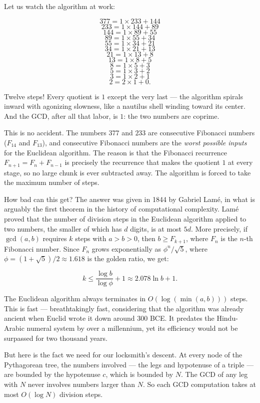 \documentclass[12pt, letterpaper, openany]{book}
\theoremstyle{definition}
\theoremstyle{remark}
\begin{document}
Let us watch the algorithm at work:

\[
377 = 1 \times 233 + 144
\]
\[
233 = 1 \times 144 + 89
\]
\[
144 = 1 \times 89 + 55
\]
\[
89 = 1 \times 55 + 34
\]
\[
55 = 1 \times 34 + 21
\]
\[
34 = 1 \times 21 + 13
\]
\[
21 = 1 \times 13 + 8
\]
\[
13 = 1 \times 8 + 5
\]
\[
8 = 1 \times 5 + 3
\]
\[
5 = 1 \times 3 + 2
\]
\[
3 = 1 \times 2 + 1
\]
\[
2 = 2 \times 1 + 0.
\]

Twelve steps! Every quotient is $1$ except the very last --- the algorithm spirals inward with agonizing slowness, like a nautilus shell winding toward its center. And the GCD, after all that labor, is $1$: the two numbers are coprime.

This is no accident. The numbers $377$ and $233$ are consecutive Fibonacci numbers ($F_{14}$ and $F_{13}$), and consecutive Fibonacci numbers are the \textit{worst possible inputs} for the Euclidean algorithm. The reason is that the Fibonacci recurrence $F_{n+1} = F_n + F_{n-1}$ is precisely the recurrence that makes the quotient $1$ at every stage, so no large chunk is ever subtracted away. The algorithm is forced to take the maximum number of steps.

How bad can this get? The answer was given in 1844 by Gabriel Lamé, in what is arguably the first theorem in the history of computational complexity. Lamé proved that the number of division steps in the Euclidean algorithm applied to two numbers, the smaller of which has $d$ digits, is at most $5d$. More precisely, if $\gcd(a, b)$ requires $k$ steps with $a > b > 0$, then $b \ge F_{k+1}$, where $F_n$ is the $n$-th Fibonacci number. Since $F_n$ grows exponentially as $\phi^n / \sqrt{5}$, where $\phi = (1 + \sqrt{5})/2 \approx 1.618$ is the golden ratio, we get:

\[
k \le \frac{\log b}{\log \phi} + 1 \approx 2.078 \ln b + 1.
\]

The Euclidean algorithm always terminates in $O(\log(\min(a, b)))$ steps. This is fast --- breathtakingly fast, considering that the algorithm was already ancient when Euclid wrote it down around 300 BCE. It predates the Hindu-Arabic numeral system by over a millennium, yet its efficiency would not be surpassed for two thousand years.

But here is the fact we need for our locksmith's descent. At every node of the Pythagorean tree, the numbers involved --- the legs and hypotenuse of a triple --- are bounded by the hypotenuse $c$, which is bounded by $N$. The GCD of any leg with $N$ never involves numbers larger than $N$. So each GCD computation takes at most $O(\log N)$ division steps.
\end{document}
